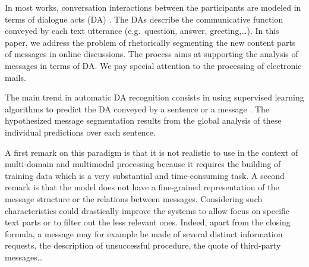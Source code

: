 In most works, conversation interactions between the participants are modeled in terms of dialogue acts (DA) \cite{austin:1970}. The DAs describe the communicative function conveyed by each text utterance  (e.g.~question, answer, greeting,\ldots).
%
In this paper, we address the problem of rhetorically segmenting the new content parts of messages in online discussions. 
The process aims at supporting the analysis of messages in terms of DA.
We pay special attention to the processing of electronic mails.

%
The main trend in automatic DA recognition consists in using supervised learning algorithms to predict the DA conveyed by a sentence or a message \cite{joty:2013:sigdial}.
%
The hypothesized message segmentation results from the global analysis of these individual predictions over each sentence.

A first remark on this paradigm is that it is not realistic to use in the context of multi-domain and multimodal processing because it requires the building of training data which is a very substantial and time-consuming task.
%
A second remark is that the model does not have a fine-grained representation of the message structure or the relations between messages. Considering such characteristics could drastically improve the systems %
to allow focus on specific text parts or to filter out the less relevant ones. %
Indeed, apart from the closing formula, a message may for example be made of several distinct information requests, the description of unsuccessful procedure, the quote of third-party messages\ldots

